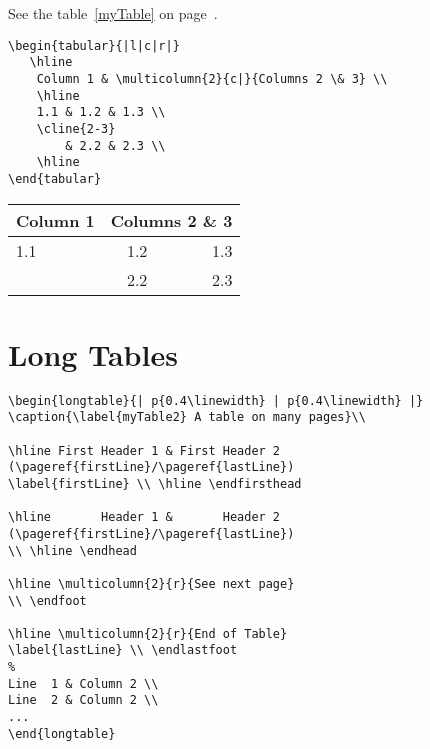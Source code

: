 \begin{Results}
See the table~\ref{myTable} on page~\pageref{myTable}.

\listoftables
\end{Results}

\begin{LaTeXsource}
\begin{verbatim}
\begin{tabular}{|l|c|r|} 
   \hline
    Column 1 & \multicolumn{2}{c|}{Columns 2 \& 3} \\
    \hline
    1.1 & 1.2 & 1.3 \\
    \cline{2-3} 
        & 2.2 & 2.3 \\
    \hline
\end{tabular}
\end{verbatim}
\end{LaTeXsource}

\begin{Results}
\begin{tabular}{|l|c|r|} 
   \hline
    Column 1 & \multicolumn{2}{c|}{Columns 2 \& 3} \\
    \hline
    1.1 & 1.2 & 1.3 \\
    \cline{2-3} 
        & 2.2 & 2.3 \\
    \hline
\end{tabular}
\end{Results}

\pagebreak
\section{Long Tables}

\begin{LaTeXsource}
\begin{verbatim}
\begin{longtable}{| p{0.4\linewidth} | p{0.4\linewidth} |}
\caption{\label{myTable2} A table on many pages}\\

\hline First Header 1 & First Header 2
(\pageref{firstLine}/\pageref{lastLine})
\label{firstLine} \\ \hline \endfirsthead

\hline       Header 1 &       Header 2
(\pageref{firstLine}/\pageref{lastLine})
\\ \hline \endhead

\hline \multicolumn{2}{r}{See next page}
\\ \endfoot

\hline \multicolumn{2}{r}{End of Table}
\label{lastLine} \\ \endlastfoot
%
Line  1 & Column 2 \\
Line  2 & Column 2 \\
...
\end{longtable}
\end{verbatim}
\end{LaTeXsource}

